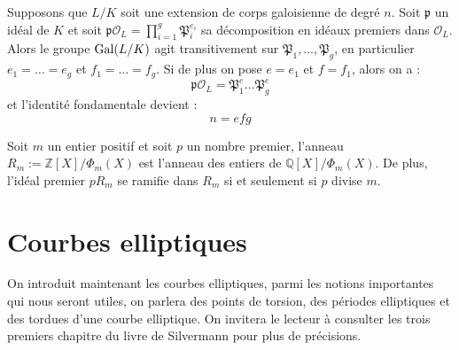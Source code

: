 \documentclass[a4paper]{article} %
\numberwithin{section}{part}
\numberwithin{equation}{section}
\newcommand\QQ{\mathbb{Q}}
\newcommand\ZZ{\mathbb{Z}}
\newcommand\EO{\mathcal{O}}
\begin{document}
\begin{thm}
\label{th:fundidgal}
Supposons que $L/K$ soit une extension de corps galoisienne de degré $n$. Soit
$\mathfrak{p}$ un idéal de $K$ et soit $\mathfrak{p}\EO_L = 
\prod_{i=1}^{g}{\mathfrak{P}_i^{e_i}}$ sa décomposition en idéaux premiers dans
$\EO_L$. Alors le groupe $\textup{Gal}(L/K)$ agit transitivement sur
$\mathfrak{P}_1,\dots,\mathfrak{P}_g$, en particulier $e_1 = \dots = e_g$ et
$f_1 = \dots = f_g$. Si de plus on pose $e = e_1$ et $f = f_1$, alors on a :
\begin{equation}
\mathfrak{p}\EO_L = \mathfrak{P}_1^e\dots\mathfrak{P}_g^e
\end{equation}
et l'identité fondamentale devient :
\begin{equation}
n = efg
\end{equation}
\end{thm}

\begin{thm}
\label{th:entiercycl}
Soit $m$ un entier positif et soit $p$ un nombre premier, l'anneau $R_m := 
\ZZ[X]/\Phi_m(X)$ est l'anneau des entiers de $\QQ[X]/\Phi_m(X)$. De plus, 
l'idéal premier $pR_m$ se ramifie dans $R_m$ si et seulement si $p$ divise $m$.
\end{thm}
\section{Courbes elliptiques}
On introduit maintenant les courbes elliptiques, parmi les notions importantes 
qui nous seront utiles, on parlera des points de torsion, des périodes 
elliptiques et des tordues d'une courbe elliptique.  On invitera
le lecteur à consulter les trois premiers chapitre du livre de 
Silvermann \cite{Sil} pour plus de précisions.
\end{document}

